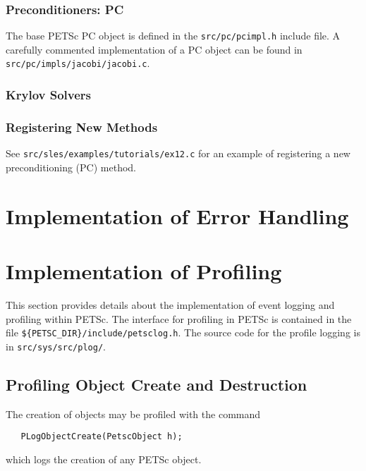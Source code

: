 \subsection{Preconditioners: PC}
The base PETSc PC object is defined in the {\tt src/pc/pcimpl.h} include file. 
A carefully commented implementation of a PC object can be found in 
{\tt src/pc/impls/jacobi/jacobi.c}. 

\subsection{Krylov Solvers}

\subsection{Registering New Methods}

See {\tt src/sles/examples/tutorials/ex12.c} for an example of registering a new
preconditioning (PC) method.

\chapter{Implementation of Error Handling}

\chapter{Implementation of Profiling}
\label{sec:profimpl}

This section provides details about the implementation of event
logging and profiling within PETSc.   
The interface for profiling in PETSc is contained in the file 
{\tt \$\{PETSC\_DIR\}/include/petsclog.h}. The source code for the profile logging
is in {\tt src/sys/src/plog/}.

\section{Profiling Object Create and Destruction}

The creation of objects may be profiled with the command
\begin{verbatim}
   PLogObjectCreate(PetscObject h);
\end{verbatim}
which logs the creation of any PETSc object. 

